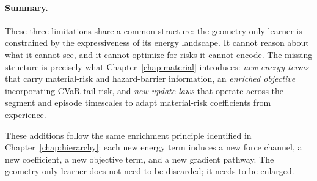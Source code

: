 \paragraph{Summary.}
These three limitations share a common structure: the geometry-only
learner is constrained by the expressiveness of its energy landscape.
It cannot reason about what it cannot see, and it cannot optimize for
risks it cannot encode.
The missing structure is precisely what Chapter~\ref{chap:material}
introduces: \emph{new energy terms} that carry material-risk and
hazard-barrier information, an \emph{enriched objective} incorporating
CVaR tail-risk, and \emph{new update laws} that operate across the
segment and episode timescales to adapt material-risk coefficients from
experience.

These additions follow the same enrichment principle identified in
Chapter~\ref{chap:hierarchy}: each new energy term induces a new
force channel, a new coefficient, a new objective term, and a new
gradient pathway.
The geometry-only learner does not need to be discarded; it needs to
be enlarged.





